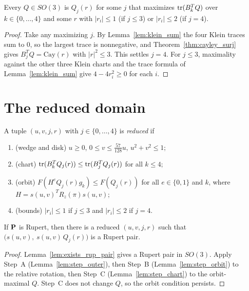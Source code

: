 \begin{lemma}
\label{lem:step_chart}
\leanok
{}
Every $Q \in SO(3)$ is $Q_j(r)$ for some $j$ that maximizes $\operatorname{\mathrm{tr}}(B_k^T Q)$ over
$k \in \{0, \dots, 4\}$ and some $r$ with $|r_i| \le 1$ (if $j \le 3$) or $|r_i| \le 2$
(if $j = 4$).
\end{lemma}
\begin{proof}
\leanok
Take any maximizing $j$. By Lemma~\ref{lem:klein_sum} the four Klein traces sum to $0$,
so the largest trace is
nonnegative, and Theorem~\ref{thm:cayley_surj} gives $B_j^T Q = \mathrm{Cay}(r)$ with
$|r|^2 \le 3$. This settles $j = 4$. For $j \le 3$, maximality against the other three
Klein charts and the trace formula of Lemma~\ref{lem:klein_sum} give
$4 - 4 r_i^2 \ge 0$ for each $i$.
\end{proof}

\section{The reduced domain}

\begin{definition}
\label{def:reduced}
\leanok
{}
A tuple $(u, v, j, r)$ with $j \in \{0, \dots, 4\}$ is \emph{reduced} if
\begin{enumerate}
\item (wedge and disk) $u \ge 0$, $0 \le v \le \frac{57}{128} u$, $u^2 + v^2 \le 1$;
\item (chart) $\operatorname{\mathrm{tr}}(B_k^T Q_j(r)) \le \operatorname{\mathrm{tr}}(B_j^T Q_j(r))$ for all $k \le 4$;
\item (orbit) $F(H^e Q_j(r) g_k) \le F(Q_j(r))$ for all $e \in \{0,1\}$ and $k$, where
  $H = s(u,v)^T R_z(\pi) s(u,v)$;
\item (bounds) $|r_i| \le 1$ if $j \le 3$ and $|r_i| \le 2$ if $j = 4$.
\end{enumerate}
\end{definition}

\begin{theorem}[Reduction]
\label{thm:reduction}
\leanok
{}
If $\operatorname{\mathbf{P}}$ is Rupert, then there is a reduced $(u, v, j, r)$ such that
$\bigl(s(u, v),\ s(u, v)\, Q_j(r)\bigr)$ is a Rupert pair.
\end{theorem}
\begin{proof}
\leanok
Lemma~\ref{lem:exists_rup_pair} gives a Rupert pair in $SO(3)$. Apply Step~A
(Lemma~\ref{lem:step_outer}), then Step~B (Lemma~\ref{lem:step_orbit}) to the
relative rotation, then Step~C (Lemma~\ref{lem:step_chart}) to the orbit-maximal $Q$.
Step~C does not change $Q$, so the orbit condition persists.
\end{proof}

